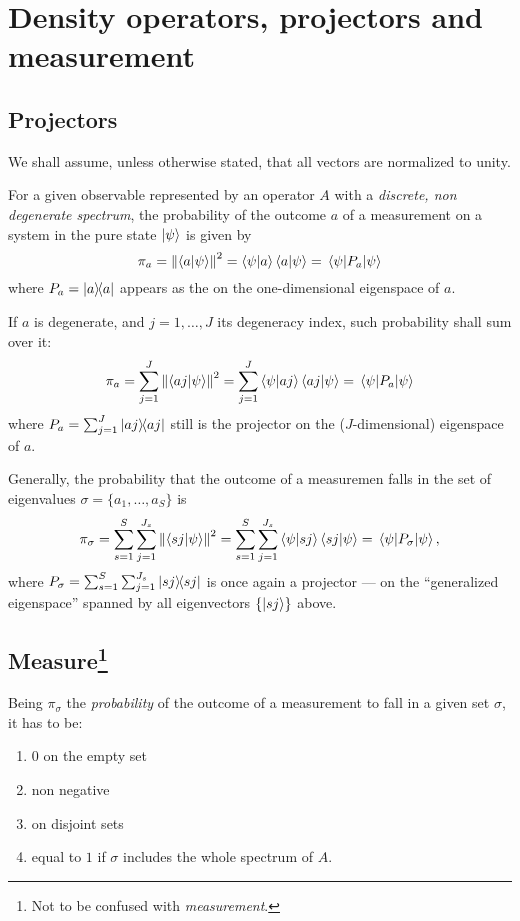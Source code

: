 \section{Density operators, projectors and measurement}

\subsection{Projectors}

We shall assume, unless otherwise stated, that all vectors are
normalized to unity.

For a given observable represented by an operator $A$ with a
\emph{discrete, non degenerate spectrum}, the probability of the
outcome $a$ of a
measurement on a system in the pure state $\ket{\psi}$ is given by
$$
\pi_{a} = \norm{\braket{a}{\psi}}^2
        = \bra{\psi}\ket{a}\bra{a}\ket{\psi}
        = \mel{\psi}{P_{a}}{\psi}
$$
where $P_{a} = \ketbra{a}$ appears as the  on the
one-dimensional eigenspace of  $a$.

If $a$ is degenerate, and $j = 1, \dots, J$ its degeneracy index,
such probability shall sum over it:
$$
\pi_{a} = \sum_{j=1}^{J}\norm{\braket{aj}{\psi}}^2
        = \sum_{j=1}^{J}\bra{\psi}\ket{aj}\bra{aj}\ket{\psi}
        = \mel{\psi}{P_{a}}{\psi}
$$
where $P_{a} = \sum_{j=1}^{J}\ketbra{aj}$
still is the projector on the
($J$-dimensional) eigenspace of $a$.

Generally, the probability that the outcome of a measuremen falls in
the set of eigenvalues $\sigma = \{a_{1}, \dots, a_{S}\}$ is
\begin{equation}\label{eq:pi_sigma}
\pi_{\sigma}  = \sum_{s=1}^{S}\sum_{j=1}^{J_{s}}\norm{\braket{sj}{\psi}}^2
              = \sum_{s=1}^{S}\sum_{j=1}^{J_{s}}\bra{\psi}\ket{sj}\bra{sj}\ket{\psi}
              = \mel{\psi}{P_{\sigma}}{\psi}
              ,
\end{equation}
where $P_{\sigma} = \sum_{s=1}^{S}\sum_{j=1}^{J_{s}}\ketbra{sj}$
is once again a projector --- on the ``generalized eigenspace'' spanned by all
eigenvectors $\{\ket{sj}\}$ above.

\subsection[Measure]{Measure\footnote{Not to be confused with \emph{measurement}.}}

\begin{remark}\label{measure_properties}
  Being $\pi_{\sigma}$ the \emph{probability} of the outcome of a measurement to
  fall in a given set $\sigma$, it has to be:
  \begin{enumerate}
    \item \label{measure_properties:first} $0$ on the empty set
    \item non negative
    \item \label{measure_properties:last}  on disjoint sets
    \item equal to $1$ if $\sigma$ includes the whole spectrum of $A$.
  \end{enumerate}
\end{remark}

